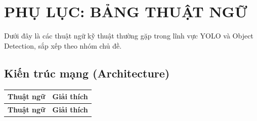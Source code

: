 \documentclass[12pt,a4paper]{report}
\begin{document}
\chapter*{PHỤ LỤC: BẢNG THUẬT NGỮ}

Dưới đây là các thuật ngữ kỹ thuật thường gặp trong lĩnh vực YOLO và Object Detection, sắp xếp theo nhóm chủ đề.

\section*{Kiến trúc mạng (Architecture)}

\begin{longtable}{p{3.5cm}p{12cm}}
\toprule
\textbf{Thuật ngữ} & \textbf{Giải thích} \\
\midrule
\endfirsthead
\toprule
\textbf{Thuật ngữ} & \textbf{Giải thích} \\
\midrule
\endhead


\end{longtable}
\end{document}
